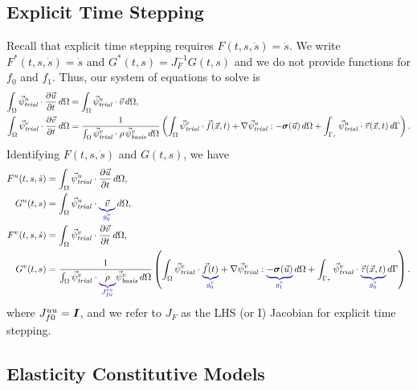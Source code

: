\subsection{Explicit Time Stepping}
Recall that explicit time stepping requires $F(t,s,\dot{s})=\dot{s}$. We write $F^*(t,s,
\dot{s}) = \dot{s}$ and
$G^*(t,s) = J_F^{-1}G(t,s)$ and we do not provide functions for $f_0$ and $f_1$. Thus, our 
system of equations to 
solve is
\begin{align}
  \label{eqn:elasticity:velocity:explicit}
  \int_\Omega \trialvec[u] \cdot \frac{\partial \vec{u}}{\partial t} \, d\Omega &= 
  \int_\Omega \trialvec[u] \cdot \vec{v} \, d\Omega, \\
%
  \label{eqn:elasticity:displacement:explicit}
  \int_\Omega \trialvec[v] \cdot \frac{\partial \vec{v}}{\partial t} \, d\Omega &=
  \frac{1}{\int_\Omega \trialvec[v] \cdot \rho\,\basisvec[v] \, d\Omega} \left( \int_\Omega 
\trialvec[v] \cdot 
\vec{f}(\vec{x},t) + \nabla \trialvec[u] : -\tensor{\sigma}(\vec{u}) \, d\Omega + 
\int_{\Gamma_\tau} \trialvec[u] 
\cdot \vec{\tau}(\vec{x},t) \, d\Gamma \right).
\end{align}
Identifying $F(t,s,\dot{s})$ and $G(t,s)$, we have
\begin{align}
  F^u(t,s,\dot{s}) &= \int_\Omega \trialvec[u] \cdot \frac{\partial \vec{u}}{\partial t} \, 
d\Omega, \\
%
  G^u(t,s) &= \int_\Omega \trialvec[u] \cdot \eqnannotate{\vec{v}}{g_0^u} \, d\Omega, \\
  F^v(t,s,\dot{s}) &= \int_\Omega \trialvec[v] \cdot \frac{\partial \vec{v}}{\partial t}  \, 
d\Omega, \\
%
  G^v(t,s) &= \frac{1}{\int_\Omega \trialvec[v] \cdot {\eqnannotate{\rho}{J_{f0}^{vv}}}
\basisvec[v] \, d\Omega} 
\left( \int_\Omega \trialvec[v] \cdot \eqnannotate{\vec{f}(t)}{g_0^v} + \nabla \trialvec[v] : 
\eqnannotate{-
\tensor{\sigma}(\vec{u})}{g_1^v} \, d\Omega + \int_{\Gamma_\tau} \trialvec[v] \cdot 
\eqnannotate{\vec{\tau}
(\vec{x},t)}{g_0^v} \, d\Gamma \right).
\end{align}
where $J_{f0}^{uu} = \bm{I}$, and we refer to $J_F$ as the LHS
(or I) Jacobian for explicit time stepping.

\subsection{Elasticity Constitutive Models}

